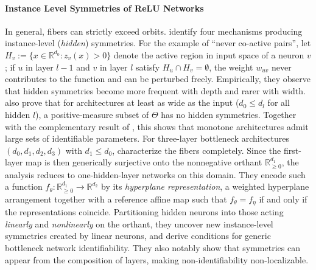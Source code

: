 \documentclass[mathematics,review,submit,moreauthors]{Definitions/mdpi}
\begin{document}
\paragraph{Instance Level Symmetries of ReLU Networks}
In general, fibers can strictly exceed orbits.
\citet{grigsby2023p4icml} identify four mechanisms producing instance-level (\emph{hidden}) symmetries.
For the example of ``never co-active pairs'', let $H_v:=\{x\in\mathbb{R}^{d_0} : z_v(x)>0\}$ denote the active region in input space of a neuron $v$; if $u$ in layer $l-1$ and $v$ in layer $l$ satisfy $H_u\cap H_v=\emptyset$, the weight $w_{uv}$ never contributes to the function and can be perturbed freely.
Empirically, they observe that hidden symmetries become more frequent with depth and rarer with width.
\citet{grigsby2023p4icml} also prove that for architectures at least as wide as the input ($d_0\le d_l$ for all hidden $l$), a positive-measure subset of $\Theta$ has no hidden symmetries.
Together with the complementary result of \citet{phuong2019}, this shows that monotone architectures admit large sets of identifiable parameters.
For three-layer bottleneck architectures $(d_0,d_1,d_2,d_3)$ with $d_1\le d_0$, \citet{gegenfurtner2026} characterize the fibers completely.
Since the first-layer map is then generically surjective onto the nonnegative orthant $\mathbb{R}^{d_1}_{\ge0}$, the analysis reduces to one-hidden-layer networks on this domain.
They encode such a function $f_\theta: \mathbb R^{d_1}_{\geq 0}\to \mathbb R^{d_2}$ by its \emph{hyperplane representation}, a weighted hyperplane arrangement together with a reference affine map such that $f_\theta=f_\eta$ if and only if the representations coincide.
Partitioning hidden neurons into those acting \emph{linearly} and \emph{nonlinearly} on the orthant, they uncover new instance-level symmetries created by linear neurons, and derive conditions for generic bottleneck network identifiability.
They also notably show that symmetries can appear from the composition of layers, making non-identifiability non-localizable.
\end{document}
